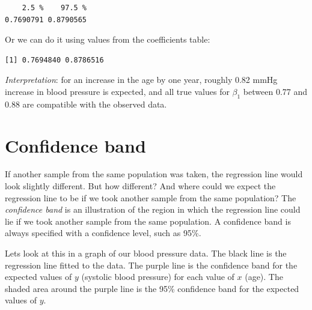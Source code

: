 \documentclass[
  letterpaper,
  8pt,
  a4paper]{book}
\newenvironment{Shaded}{\begin{snugshade}}{\end{snugshade}}
\newcommand{\DecValTok}[1]{\textcolor[rgb]{0.68,0.00,0.00}{#1}}
\newcommand{\FloatTok}[1]{\textcolor[rgb]{0.68,0.00,0.00}{#1}}
\newcommand{\FunctionTok}[1]{\textcolor[rgb]{0.28,0.35,0.67}{#1}}
\newcommand{\NormalTok}[1]{\textcolor[rgb]{0.00,0.23,0.31}{#1}}
\newcommand{\OtherTok}[1]{\textcolor[rgb]{0.00,0.23,0.31}{#1}}
\newcommand{\SpecialCharTok}[1]{\textcolor[rgb]{0.37,0.37,0.37}{#1}}
\begin{document}
\begin{verbatim}
    2.5 %    97.5 % 
0.7690791 0.8790565 
\end{verbatim}

Or we can do it using values from the coefficients table:

\begin{Shaded}
\end{Shaded}

\begin{verbatim}
[1] 0.7694840 0.8786516
\end{verbatim}

\emph{Interpretation}: for an increase in the age by one year, roughly
0.82 mmHg increase in blood pressure is expected, and all true values
for \(\beta_1\) between 0.77 and 0.88 are compatible with the observed
data.

\section*{Confidence band}\label{confidence-band}


If another sample from the same population was taken, the regression
line would look slightly different. But how different? And where could
we expect the regression line to be if we took another sample from the
same population? The \emph{confidence band} is an illustration of the
region in which the regression line could lie if we took another sample
from the same population. A confidence band is always specified with a
confidence level, such as 95\%.

Lets look at this in a graph of our blood pressure data. The black line
is the regression line fitted to the data. The purple line is the
confidence band for the expected values of \(y\) (systolic blood
pressure) for each value of \(x\) (age). The shaded area around the
purple line is the 95\% confidence band for the expected values of
\(y\).
\end{document}
